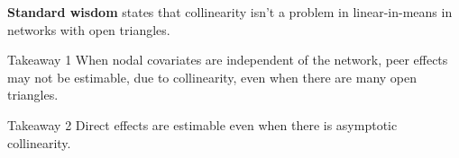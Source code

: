 \documentclass[aspectratio=169]{beamer}
\theoremstyle{remark}
\begin{document}
\begin{frame}
    \textbf{Standard wisdom} states that collinearity isn't a problem in linear-in-means in networks with open triangles.
    
    \vspace{4mm}
    
    \begin{block}{Takeaway 1}
        When nodal covariates are independent of the network, peer effects may not be estimable, due to collinearity, even when there are many open triangles.
    \end{block}
    
    \vspace{4mm}
    
    \begin{block}{Takeaway 2}
        Direct effects are estimable even when there is asymptotic collinearity.
    \end{block}
\end{frame}
\end{document}
